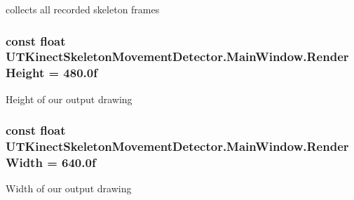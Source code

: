 collects all recorded skeleton frames 

\hypertarget{classUTKinectSkeletonMovementDetector_1_1MainWindow_a83c4f5f87333f29e1e75c98b7a6ba80c}{
\subsubsection[{Render\-Height}]{\setlength{\rightskip}{0pt plus 5cm}const float U\-T\-Kinect\-Skeleton\-Movement\-Detector.\-Main\-Window.\-Render\-Height = 480.\-0f\hspace{0.3cm}{\ttfamily [private]}}}\label{classUTKinectSkeletonMovementDetector_1_1MainWindow_a83c4f5f87333f29e1e75c98b7a6ba80c}


Height of our output drawing 

\hypertarget{classUTKinectSkeletonMovementDetector_1_1MainWindow_af3b183ca66b6137dfa971ce2bd41ad61}{
\subsubsection[{Render\-Width}]{\setlength{\rightskip}{0pt plus 5cm}const float U\-T\-Kinect\-Skeleton\-Movement\-Detector.\-Main\-Window.\-Render\-Width = 640.\-0f\hspace{0.3cm}{\ttfamily [private]}}}\label{classUTKinectSkeletonMovementDetector_1_1MainWindow_af3b183ca66b6137dfa971ce2bd41ad61}


Width of our output drawing 

